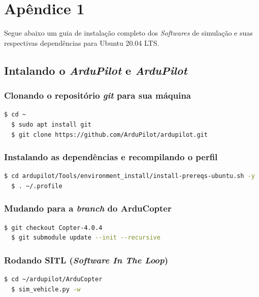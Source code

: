 \documentclass[12pt,a4paper,oneside]{book}
\begin{document}

%

%
%
\thispagestyle{myheadings}

%

%
%
%
%
\appendix
%
%
%
\chapter{Apêndice 1}
%
\thispagestyle{empty} 
%
Segue abaixo um guia de instalação completo dos \textit{Softwares} de simulação e suas respectivas dependências para Ubuntu 20.04 LTS.

\section{Intalando o \textit{ArduPilot} e \textit{ArduPilot}}

\subsection{Clonando o repositório \textit{git} para sua máquina}
\begin{lstlisting}[language=bash]
  $ cd ~
  $ sudo apt install git
  $ git clone https://github.com/ArduPilot/ardupilot.git
\end{lstlisting}

\subsection{Instalando as dependências e recompilando o perfil}
\begin{lstlisting}[language=bash]
  $ cd ardupilot/Tools/environment_install/install-prereqs-ubuntu.sh -y
  $ . ~/.profile
\end{lstlisting}

\subsection{Mudando para a \textit{branch} do ArduCopter}
\begin{lstlisting}[language=bash]
  $ git checkout Copter-4.0.4
  $ git submodule update --init --recursive
\end{lstlisting}

\subsection{Rodando SITL (\textit{Software In The Loop})}
\begin{lstlisting}[language=bash]
  $ cd ~/ardupilot/ArduCopter
  $ sim_vehicle.py -w
\end{lstlisting}
\end{document}
